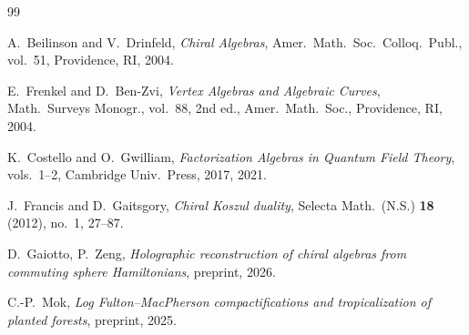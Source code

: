 \documentclass[11pt]{article}
\theoremstyle{definition}
\theoremstyle{remark}
\numberwithin{equation}{section}
\begin{document}
\begin{thebibliography}{99}

A.~Beilinson and V.~Drinfeld,
\emph{Chiral Algebras},
Amer.\ Math.\ Soc.\ Colloq.\ Publ., vol.~51,
Providence, RI, 2004.

E.~Frenkel and D.~Ben-Zvi,
\emph{Vertex Algebras and Algebraic Curves},
Math.\ Surveys Monogr., vol.~88, 2nd ed.,
Amer.\ Math.\ Soc., Providence, RI, 2004.

K.~Costello and O.~Gwilliam,
\emph{Factorization Algebras in Quantum Field Theory},
vols.~1--2, Cambridge Univ.\ Press, 2017, 2021.

J.~Francis and D.~Gaitsgory,
\emph{Chiral Koszul duality},
Selecta Math.\ (N.S.) \textbf{18} (2012), no.~1, 27--87.

D.~Gaiotto, P.~Zeng,
\emph{Holographic reconstruction of chiral algebras from commuting
sphere Hamiltonians},
preprint, 2026.

C.-P.~Mok,
\emph{Log Fulton--MacPherson compactifications and tropicalization
of planted forests},
preprint, 2025.

\end{thebibliography}
\end{document}
